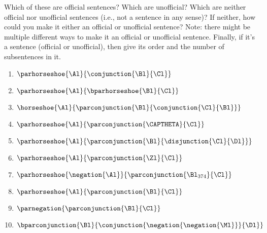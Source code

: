 Which of these are official sentences? Which are unofficial? Which are neither official nor unofficial sentences (i.e., not a sentence in any sense)? If
neither, how could you make it either an official or unofficial sentence? Note: there
might be multiple different ways to make it an official or unofficial sentence. Finally, if it's a sentence (official or unofficial), then give its order and the number of subsentences in it. 
\begin{multicols}{2}
\begin{enumerate}
\item {$\parhorseshoe{\Al}{\conjunction{\Bl}{\Cl}}$}
\item {$\parhorseshoe{\Al}{\bparhorseshoe{\Bl}{\Cl}}$}
\item {$\horseshoe{\Al}{\parconjunction{\Bl}{\conjunction{\Cl}{\Bl}}}$}
\item {$\parhorseshoe{\Al}{\parconjunction{\CAPTHETA}{\Cl}}$}
\item {$\parhorseshoe{\Al}{\parconjunction{\Bl}{\disjunction{\Cl}{\Dl}}}$}
\item {$\parhorseshoe{\Al}{\parconjunction{\Zl}{\Cl}}$}
\item {$\parhorseshoe{\negation{\Al}}{\parconjunction{\Bl_{374}}{\Cl}}$}
\item {$\parhorseshoe{\Al}{\parconjunction{\Bl}{\Cl}}$}
\item {$\parnegation{\parconjunction{\Bl}{\Cl}}$}
\item {$\bparconjunction{\Bl}{\conjunction{\negation{\negation{\Ml}}}{\Dl}}$}
\end{enumerate}
\end{multicols}

